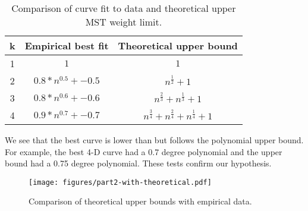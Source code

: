 \begin{table}
\begin{tabular}{|c|c|c|}
\hline
k&Empirical best fit&Theoretical upper bound\\
\hline
1&$1$&$1$\\
2&$0.8*n^{0.5} + -0.5$&$n^{\frac{1}{2}} + 1$\\
3&$0.8*n^{0.6} + -0.6$&$n^{\frac{2}{3}} + n^{\frac{1}{3}} + 1$\\
4&$0.9*n^{0.7} + -0.7$&$n^{\frac{3}{4}} + n^{\frac{2}{4}} + n^{\frac{1}{4}} + 1$\\
\hline
\end{tabular}
\caption{Comparison of curve fit to data and theoretical upper MST weight
  limit.}
\label{table:part2-comparison}
\end{table}

We see that the best curve is lower than but follows the polynomial upper
bound. For example, the best 4-D curve had a 0.7 degree polynomial and the
upper bound had a 0.75 degree polynomial. These tests confirm our
hypothesis.

\begin{figure}[htb!]
\centering
\texttt{[image: figures/part2-with-theoretical.pdf]}
\caption{Comparison of theoretical upper bounds with empirical data.}
\label{fig:part2-with-theoretical}
\end{figure}
